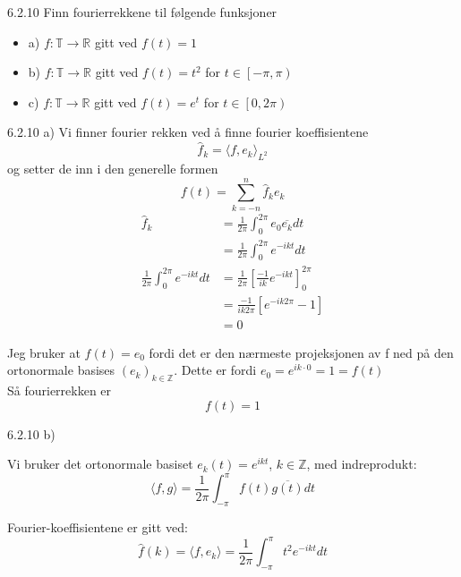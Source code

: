 \documentclass[a4paper,norsk]{article}
\begin{document}
\begin{oppgavebox}{6.2.10}{}
Finn fourierrekkene til følgende funksjoner
\begin{itemize}
  \item a) $ f: \mathbb{T} \rightarrow \mathbb{R} $ gitt ved $ f(t) = 1 $  
  \item b) $ f: \mathbb{T} \rightarrow \mathbb{R} $ gitt ved $ f(t) = t^2 $ for $ t \in \left[ -\pi, \pi \right)  $   
  \item c) $ f: \mathbb{T} \rightarrow \mathbb{R} $ gitt ved $ f(t) = e^{t}  $ for $ t \in \left[ 0, 2 \pi \right) $ 
\end{itemize}


\begin{proofbox}{6.2.10 a)}{}
Vi finner fourier rekken ved å finne fourier koeffisientene
\[
    \hat{f}_k = \langle f, e_k \rangle_{ L^2 } 
\]
og setter de inn i den generelle formen
\[
    f(t) = \sum_{ k =-n }^{ n } \hat{f}_k e_k
\]
\begin{align*}
  \hat{f}_k &= \frac{ 1 }{ 2 \pi } \int_{0}^{2 \pi 
  } e_0 \overline{e_k} dt \\
  &= \frac{ 1 }{ 2 \pi  }  \int_{0}^{2 \pi } e^{-ikt} dt \\  
  \frac{ 1 }{ 2 \pi  } \int_{0 }^{2 \pi } e^{-ikt} dt &=   \frac{ 1 }{ 2 \pi  } \left[ \frac{ -1 }{ ik } e^{-ikt}  \right]  _0^{2 \pi } \\
  &= \frac{ -1 }{ ik 2 \pi  } \left[ e^{-ik2 \pi } - 1  \right] \\
  &= 0
\end{align*}

Jeg bruker at $ f(t) = e_0 $ fordi det er den nærmeste projeksjonen av f ned på den ortonormale basises $ \left( e_k \right) _{k \in \mathbb{Z}} $. Dette er fordi $ e_0 = e^{ik \cdot 0} = 1 = f(t)  $\\

Så fourierrekken er \[
    f(t) = 1
\]

\end{proofbox}

\begin{proofbox}{6.2.10 b)}{}


Vi bruker det ortonormale basiset $e_k(t) = e^{ikt}$, $k \in \mathbb{Z}$, med indreprodukt:
\[
\langle f, g \rangle = \frac{1}{2\pi} \int_{-\pi}^{\pi} f(t) \overline{g(t)}  dt
\]

Fourier-koeffisientene er gitt ved:
\[
\hat{f}(k) = \langle f, e_k \rangle = \frac{1}{2\pi} \int_{-\pi}^{\pi} t^2 e^{-ikt}  dt
\]


\end{proofbox}
\end{oppgavebox}
\end{document}
